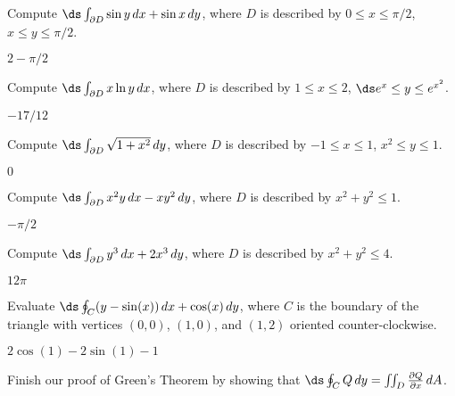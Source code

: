\begin{enumialphparenastyle}
\begin{ex}
Compute $\ds\int_{\partial D} \sin y\,dx + \sin x\,dy$, 
where $D$ is described by $0\le x\le \pi/2$, $x\le y\le \pi/2$.
\begin{sol}
	$2-\pi/2$
\end{sol}
\end{ex}

\begin{ex}
Compute $\ds\int_{\partial D} x\ln y\,dx$,
where $D$ is described by $1\le x\le 2$, $\ds e^x\le y\le e^{x^2}$.
\begin{sol}
	$-17/12$
\end{sol}
\end{ex}

\begin{ex}
Compute $\ds\int_{\partial D} \sqrt{1+x^2}\,dy$, 
where $D$ is described by $-1\le x\le 1$, $x^2\le y\le 1$.
\begin{sol}
	$0$
\end{sol}
\end{ex}

\begin{ex}
Compute $\ds\int_{\partial D} x^2y\,dx - xy^2\,dy$, 
where $D$ is described by $x^2+y^2\le 1$.
\begin{sol}
	$-\pi/2$
\end{sol}
\end{ex}

\begin{ex}
Compute $\ds\int_{\partial D} y^3\,dx + 2x^3\,dy$, 
where $D$ is described by $x^2+y^2\le 4$.
\begin{sol}
	$12\pi$
\end{sol}
\end{ex}

\begin{ex}
Evaluate $\ds\oint_C (y-\sin(x))\,dx + \cos(x) \, dy$,
where $C$ is the boundary of the triangle with vertices $(0,0)$,
$(1,0)$, and $(1,2)$ oriented counter-clockwise.
\begin{sol}
	$2\cos(1)-2\sin(1)-1$
\end{sol}
\end{ex}

\begin{ex}
Finish our proof of Green's Theorem by showing that
$\ds\oint_C Q\,dy=\iint_{D} {\partial Q\over\partial x}\,dA$.
\end{ex}

\end{enumialphparenastyle}